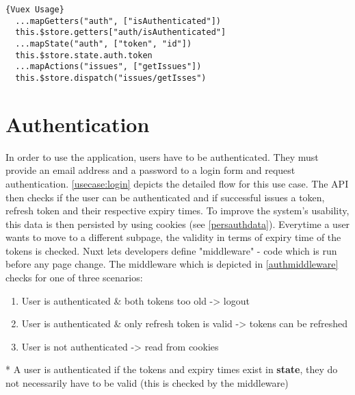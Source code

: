 \begin{lstlisting}[caption=Vuex Usage, captionpos=b, style=htmlcssjs, label=vuexsamples]{Vuex Usage}
  ...mapGetters("auth", ["isAuthenticated"])
  this.$store.getters["auth/isAuthenticated"]
  ...mapState("auth", ["token", "id"])
  this.$store.state.auth.token
  ...mapActions("issues", ["getIssues"])
  this.$store.dispatch("issues/getIsses")
\end{lstlisting}



\section{Authentication}
In order to use the application, users have to be authenticated. They must provide an email address and a password to a login form and request authentication. \autoref{usecase:login} depicts the detailed flow for this use case. The API then checks if the user can be authenticated and if successful issues a token, refresh token and their respective expiry times. To improve the system's usability, this data is then persisted by using cookies (see \autoref{persauthdata}). Everytime a user wants to move to a different subpage, the validity in terms of expiry time of the tokens is checked. Nuxt lets developers define "middleware" - code which is run before any page change. The middleware which is depicted in \autoref{authmiddleware} checks for one of three scenarios:

\begin{enumerate}
  \item User is authenticated \& both tokens too old -> logout
  \item User is authenticated \& only refresh token is valid -> tokens can be refreshed
  \item User is not authenticated -> read from cookies
\end{enumerate}

* A user is authenticated if the tokens and expiry times exist in \textbf{state}, they do not necessarily have to be valid (this is checked by the middleware) 

